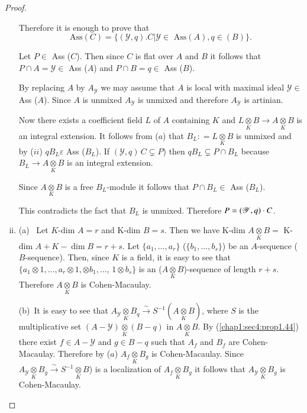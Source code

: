 \begin{proof}
\begin{enumerate}[(i)]
  Therefore it is enough to prove that
  $$
  \text {Ass} (C) = \{ (\mathscr{Y}, q). C | \mathscr{Y} \in
  \text { Ass} (A), q \in (B) \}. 
  $$
  
  Let $P \in$ Ass ($C$). Then since $C$ is flat over $A$ and $B$
  it follows that $P \cap A = \mathscr{Y} \in$ Ass ($A$) and $P
  \cap B = q \in$ Ass ($B$). 
  
  By replacing $A$ by $A _\mathscr{Y}$ we may assume that $A$ is local\pageoriginale
  with maximal ideal $\mathscr{Y} \in$ Ass ($A$). Since $A$ is
  unmixed $A_{\mathscr{Y}}$ is unmixed and therefore $A_{\mathscr{Y}}$
  is artinian. 
  
  Now there exists a coefficient field $L$ of $A$ containing $K$ and $L
  \underset{K}{\otimes} B \to A \underset{K}{\otimes} B$ is an
  integral extension. It follows from ($a$) that $B_L:  = L
  \underset{K}{\otimes} B $ is unmixed and by ($ii$) $qB_L \varepsilon$
  Ass ($B_L$). If $(\mathscr{Y}, q)\,  C \subsetneq P$) then  $qB_L \subsetneq
  P \cap B_L$ because $B_L \to A \underset{K}{\otimes} B$ is an
  integral extension. 
  
  Since $A \underset {K}{\otimes} B$ is a free $B_L$-module it follows
  that $P \cap B_L \in$ Ass ($B_L$). 

  This contradicts the fact that $B_L$ is unmixed. Therefore $P =
  (\mathscr{Y}, q)\break \cdot C$. 
\item
  (a)~ Let $K$-dim $A = r$ and K-dim $B=s$. Then we have K-dim $A
    \underset{K}{\otimes} B =$ K-dim $A+K-\dim B=r + s$. Let $\{ a_1,
    \ldots,  a_r \}$ (\resp  $\{ b_1, \ldots,  b_s \}$) be an
    $A$-sequence (\resp  $B$-sequence). Then, since $K$ is a field, it is
    easy to see that $\{ a_1 \otimes 1, \ldots,  a_r \otimes 1,
    \otimes b_1, \ldots$,  $1 \otimes b_s\}$ is an ($A
    \underset{K}{\otimes} B$)-sequence of length $r+s$. Therefore   
    $A\underset{K}{\otimes} B$ is Cohen-Macaulay. 

(b)~It is easy to see that $A_{\mathscr{Y}} \underset{K}{\otimes}
  B_q  \xrightarrow{\sim} S^{-1} (A \underset{K}{\otimes} B)$, where
  $S$ is the multiplicative set $(A-\mathscr{Y}) \underset{K}{\otimes}
  (B-q)$ in $A \underset{K}{\otimes} B$. By
  (\ref{chap1:sec4:prop1.44}) there exist $f 
  \in A-\mathscr{Y}$ and $ g \in B-q$ such that $A_f$
  and $B_f$ are Cohen-Macaulay. Therefore by ($a$) $A_f
  \underset{K}{\otimes} B_g$ is Cohen-Macaulay. Since $A_{\mathscr{Y}}
  \underset{K}{\otimes} B_g \xrightarrow{\sim} S^{-1}
  \underset{K}{\otimes} B$) is a localization of $A_f
  \underset{K}{\otimes} B_g$ it follows that $A_{\mathscr{Y}}
  \underset{K}{\otimes} B_g$ is Cohen-Macaulay. 
  \end{enumerate}
\end{proof}
